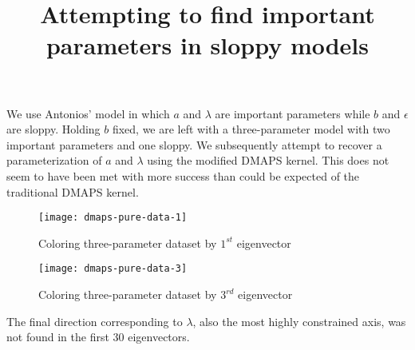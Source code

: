 \documentclass[11pt]{article}
\title{Attempting to find important parameters in sloppy models}
\begin{document}
\maketitle

We use Antonios' model in which $a$ and $\lambda$ are important parameters while $b$ and $\epsilon$ are sloppy. Holding $b$ fixed, we are left with a three-parameter model with two important parameters and one sloppy. We subsequently attempt to recover a parameterization of $a$ and $\lambda$ using the modified DMAPS kernel. This does not seem to have been met with more success than could be expected of the traditional DMAPS kernel.

\begin{figure}[htbp]
  \centering
  \texttt{[image: dmaps-pure-data-1]}
  \caption{Coloring three-parameter dataset by $1^{st}$ eigenvector}
\end{figure}

\begin{figure}[htbp]
  \centering
  \texttt{[image: dmaps-pure-data-3]}
  \caption{Coloring three-parameter dataset by $3^{rd}$ eigenvector}
\end{figure}

The final direction corresponding to $\lambda$, also the most highly constrained axis, was not found in the first 30 eigenvectors.

% 
% 
\end{document}
